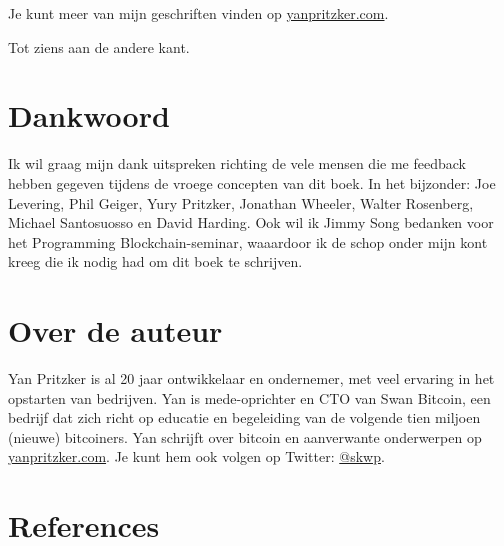 \documentclass[
  letterpaper,
]{scrbook}
\newlength{\cslhangindent}
\newlength{\cslentryspacingunit} %
\newenvironment{CSLReferences}[2] %
 {%
  \setlength{\parindent}{0pt}
  \ifodd #1
  \let\oldpar\par
  \def\par{\hangindent=\cslhangindent\oldpar}
  \fi
  \setlength{\parskip}{#2\cslentryspacingunit}
 }%
 {}
\begin{document}
Je kunt meer van mijn geschriften vinden op
\href{https://yanpritzker.com}{yanpritzker.com}.

Tot ziens aan de andere kant.


\hypertarget{dankwoord}{%
\chapter*{Dankwoord}\label{dankwoord}}


Ik wil graag mijn dank uitspreken richting de vele mensen die me
feedback hebben gegeven tijdens de vroege concepten van dit boek. In het
bijzonder: Joe Levering, Phil Geiger, Yury Pritzker, Jonathan Wheeler,
Walter Rosenberg, Michael Santosuosso en David Harding. Ook wil ik Jimmy
Song bedanken voor het Programming Blockchain-seminar, waaardoor ik de
schop onder mijn kont kreeg die ik nodig had om dit boek te schrijven.


\hypertarget{over-de-auteur}{%
\chapter*{Over de auteur}\label{over-de-auteur}}


Yan Pritzker is al 20 jaar ontwikkelaar en ondernemer, met veel ervaring
in het opstarten van bedrijven. Yan is mede-oprichter en CTO van Swan
Bitcoin, een bedrijf dat zich richt op educatie en begeleiding van de
volgende tien miljoen (nieuwe) bitcoiners. Yan schrijft over bitcoin en
aanverwante onderwerpen op
\href{https://yanpritzker.com}{yanpritzker.com}. Je kunt hem ook volgen
op Twitter: \href{https://twitter.com/skwp}{@skwp}.


\hypertarget{references}{%
\chapter*{References}\label{references}}


\hypertarget{refs}{}
\begin{CSLReferences}{0}{0}
\end{CSLReferences}


\backmatter
\end{document}
